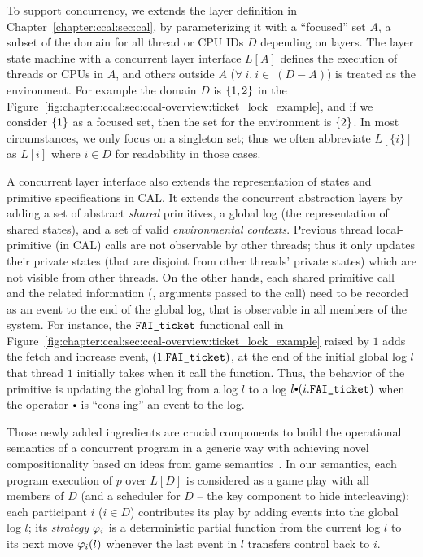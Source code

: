 To support concurrency, 
we extends the layer definition in Chapter~\ref{chapter:ccal:sec:cal},
by parameterizing it with a ``focused'' set $A$, a subset of the domain for all thread or CPU IDs $D$ depending on layers.
The layer state machine with a concurrent layer interface $L[A]$ defines
the execution of threads or CPUs in $A$,
and others outside $A$ ($\forall \ i . \ i \in\ (D - A)$) is treated as the environment. 
For example the domain $D$ is $\{1, 2\}$ in the Figure~\ref{fig:chapter:ccal:sec:ccal-overview:ticket_lock_example}, 
and if we consider $\{1\}$ as a focused set, then the set for the environment is $\{2\}$.
In most circumstances, we only focus on a singleton set; thus we often abbreviate $L[\{i\}]$ as $L[i]$ where $i\in{}D$ for readability in those cases.


A concurrent layer interface also extends 
the representation of states and primitive specifications in CAL.
It extends the concurrent abstraction layers by adding a set of abstract \textit{shared} primitives, a global log (the representation of shared states), and a set of valid \textit{environmental contexts}. 
Previous thread local-primitive (in CAL) calls are not observable by other threads;
thus it only updates their private states (that are disjoint from other threads' private states) which are not visible from other threads. 
On the other hands, each shared primitive call and the related information (\ie, arguments passed to the call) 
need to be recorded as an event to the end of the global log, that is observable in all members of the system. 
For instance, 
the ${\mathrm{\texttt{FAI\_ticket}}}$ functional call in Figure~\ref{fig:chapter:ccal:sec:ccal-overview:ticket_lock_example}
raised by $1$ adds the fetch and increase event, $(1.{\mathrm{\texttt{FAI\_ticket}}})$, at the end of the 
initial global log $l$ that thread $1$ initially takes when it call the function.
Thus, the behavior of the primitive is updating the global log from a log $l$ to a log $l \cons (i.\incticket)$ when the operator $\cons$ is ``cons-ing'' an event to the log. 

Those newly added ingredients are crucial 
components to build the operational semantics of a concurrent program  
in a generic way
with achieving novel compositionality based on
ideas from game semantics~\cite{gsinvite}. 
In our semantics, 
each program execution of $p$ over 
$L[D]$ is considered as a game play with all members of $D$ (and a scheduler for $D$ -- the key component to hide interleaving):
each participant $i$ ($i\in{}D$) contributes its
play by adding events into the global log $l$; its {\em strategy}
$\varphi_{i}$ is a deterministic partial function from
the current log $l$ to its next move $\varphi_{i}(l)$ whenever
the last event in $l$ transfers control back to $i$.

